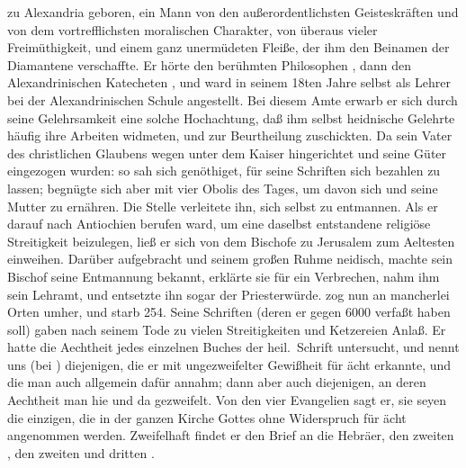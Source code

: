 \begin{aufza}
\item {} zu Alexandria geboren, ein Mann von den außerordentlichsten Geisteskräften und von dem vortrefflichsten moralischen Charakter, von überaus vieler Frei\-mü\-thig\-keit, und einem ganz unermüdeten Fleiße, der ihm den Beinamen der Diamantene verschaffte. Er hörte den berühmten Philosophen , dann den Alexandrinischen Katecheten , und ward in seinem 18ten Jahre selbst als Lehrer bei der Alexandrinischen Schule angestellt. Bei diesem Amte erwarb er sich durch seine Gelehrsamkeit eine solche Hochachtung, daß ihm selbst heidnische Gelehrte häufig ihre Arbeiten widmeten, und zur Beurtheilung zuschickten. Da sein Vater  des christlichen Glaubens wegen unter dem Kaiser  hingerichtet und seine Güter eingezogen wurden: so sah sich  genöthiget, für seine Schriften sich bezahlen zu lassen; begnügte sich aber mit vier Obolis des Tages, um davon sich und seine Mutter zu ernähren. Die Stelle  verleitete ihn, sich selbst zu entmannen. Als er darauf nach Antiochien berufen ward, um eine daselbst entstandene religiöse Streitigkeit beizulegen, ließ er sich von dem Bischofe zu Jerusalem zum Aeltesten einweihen. Darüber aufgebracht und seinem großen Ruhme neidisch, machte sein Bischof  seine Entmannung bekannt, erklärte sie für ein Verbrechen, nahm ihm sein Lehramt, und entsetzte ihn sogar der Priesterwürde.  zog nun an mancherlei Orten umher, und starb 254. Seine Schriften (deren er gegen 6000 verfaßt haben soll) gaben nach seinem Tode zu vielen Streitigkeiten und Ketzereien Anlaß. Er hatte die Aechtheit jedes einzelnen Buches der heil.\ Schrift untersucht, und nennt uns (bei ) diejenigen, die er mit ungezweifelter Gewißheit für ächt erkannte, und die man auch allgemein dafür annahm; dann aber auch diejenigen, an deren Aechtheit man hie und da gezweifelt. Von den vier Evangelien sagt er, sie seyen die einzigen, die in der ganzen Kirche Gottes ohne Widerspruch für ächt angenommen werden. Zweifelhaft findet er den Brief an die Hebräer, den zweiten , den zweiten und dritten .
\end{aufza}

